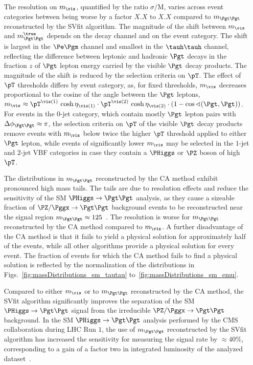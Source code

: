The resolution on $m_{\vis}$, quantified by the ratio $\sigma/\textrm{M}$,
varies across event categories between being worse by a factor $X.X$ to $X.X$ compared to $m_{\Pgt\Pgt}$ reconstructed by the SVfit algorithm.
The magnitude of the shift between $m_{\vis}$ and $m_{\Pgt\Pgt}^{\true}$ depends on the decay channel and on the event category.
The shift is largest in the $\Pe\Pgm$ channel and smallest in the $\tauh\tauh$ channel,
reflecting the difference between leptonic and hadronic $\Pgt$ decays in the fraction $z$ of $\Pgt$ lepton energy carried by the visible $\Pgt$ decay products.
The magnitude of the shift is reduced by the selection criteria on $\pT$.
The effect of $\pT$ thresholds differs by event category,
as, for fixed thresholds, $m_{\vis}$ decreases proportional to the cosine of the angle between the $\Pgt$ leptons,
$m_{\vis} \approx \pT^{\vis(1)} \, \cosh\eta_{\vis(1)} \cdot \pT^{\vis(2)} \, \cosh\eta_{\vis(2)} \cdot \left( 1 - \cos\sphericalangle(\Pgt,\Pgt) \right)$.
For events in the $0$-jet category, which contain mostly $\Pgt$ lepton pairs with $\Delta\phi_{\Pgt\Pgt} \approx \pi$,
the selection criteria on $\pT$ of the visible $\Pgt$ decay products remove events with $m_{\vis}$ below twice the higher $\pT$ threshold applied to either $\Pgt$ lepton,
while events of significantly lower $m_{\vis}$ may be selected in the $1$-jet and $2$-jet VBF categories in case they contain a $\PHiggs$ or $\PZ$ boson of high $\pT$.

The distributions in $m_{\Pgt\Pgt}$ reconstructed by the CA method exhibit pronounced high mass tails.
The tails are due to resolution effects and reduce the sensitivity of the SM $\PHiggs \to \Pgt\Pgt$ analysis,
as they cause a sizeable fraction of $\PZ/\Pggx \to \Pgt\Pgt$ background events
to be reconstructed near the signal region $m_{\Pgt\Pgt} \approx 125$~\GeV.
The resolution is worse for $m_{\Pgt\Pgt}$ reconstructed by the CA method compared to $m_{\vis}$.
A further disadvantage of the CA method is that it fails to yield a physical solution for approximately half of the events,
while all other algorithms provide a physical solution for every event.
The fraction of events for which the CA method fails to find a physical solution is reflected by the normalization of the distributions
in Figs.~\ref{fig:massDistributions_sm_tautau} to~\ref{fig:massDistributions_sm_emu}.

Compared to either $m_{\vis}$ or to $m_{\Pgt\Pgt}$ reconstructed by the CA method,
the SVfit algorithm significantly improves the separation of the SM $\PHiggs \to \Pgt\Pgt$ signal
from the irreducible $\PZ/\Pggx \to \Pgt\Pgt$ background.
In the SM $\PHiggs \to \Pgt\Pgt$ analysis performed by the CMS collaboration during LHC Run $1$,
the use of $m_{\Pgt\Pgt}$ reconstructed by the SVfit algorithm
has increased the sensitivity for measuring the signal rate by $\approx 40\%$,
corresponding to a gain of a factor two in integrated luminosity of the analyzed dataset~\cite{HIG-13-004}.

